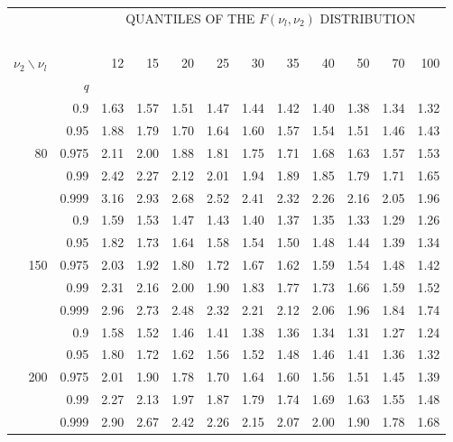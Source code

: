 \documentclass[12pt,a4paper,openany,twoside]{report}
\theoremstyle{definition}
\theoremstyle{remark}
\theoremstyle{plain}
\theoremstyle{definition}
\theoremstyle{definition}
\theoremstyle{definition}
\theoremstyle{remark}
\begin{document}
\begin{center}
\begin{tabular}{rr@{\ \ }r@{\ \ }r@{\ \ }r@{\ \ }r@{\ \ }r@{\ \ }r@{\ \ }r@{\ \ }r@{\ \ }r@{\ \ }r@{ }}
& &\multicolumn{10}{c}{QUANTILES OF THE $F(\nu_l, \nu_2)$ DISTRIBUTION}\\
\ \\
$\nu_2\backslash\nu_l$ & & 12 & 15 & 20 & 25 & 30 & 35 & 40 & 50 & 70 & 100\\
 & \textit{q}  &  &  &  &  &  &  &  &  & & \\
\rule{0pt}{2.5ex} & 0.9 & 1.63 & 1.57 & 1.51 & 1.47 & 1.44 & 1.42 & 1.40 & 1.38 & 1.34 & 1.32\\
 & 0.95 & 1.88 & 1.79 & 1.70 & 1.64 & 1.60 & 1.57 & 1.54 & 1.51 & 1.46 & 1.43\\
80 & 0.975 & 2.11 & 2.00 & 1.88 & 1.81 & 1.75 & 1.71 & 1.68 & 1.63 & 1.57 & 1.53\\
 & 0.99 & 2.42 & 2.27 & 2.12 & 2.01 & 1.94 & 1.89 & 1.85 & 1.79 & 1.71 & 1.65\\
 & 0.999 & 3.16 & 2.93 & 2.68 & 2.52 & 2.41 & 2.32 & 2.26 & 2.16 & 2.05 & 1.96\\
\rule{0pt}{2.5ex} & 0.9 & 1.59 & 1.53 & 1.47 & 1.43 & 1.40 & 1.37 & 1.35 & 1.33 & 1.29 & 1.26\\
 & 0.95 & 1.82 & 1.73 & 1.64 & 1.58 & 1.54 & 1.50 & 1.48 & 1.44 & 1.39 & 1.34\\
150 & 0.975 & 2.03 & 1.92 & 1.80 & 1.72 & 1.67 & 1.62 & 1.59 & 1.54 & 1.48 & 1.42\\
 & 0.99 & 2.31 & 2.16 & 2.00 & 1.90 & 1.83 & 1.77 & 1.73 & 1.66 & 1.59 & 1.52\\
 & 0.999 & 2.96 & 2.73 & 2.48 & 2.32 & 2.21 & 2.12 & 2.06 & 1.96 & 1.84 & 1.74\\
\rule{0pt}{2.5ex} & 0.9 & 1.58 & 1.52 & 1.46 & 1.41 & 1.38 & 1.36 & 1.34 & 1.31 & 1.27 & 1.24\\
 & 0.95 & 1.80 & 1.72 & 1.62 & 1.56 & 1.52 & 1.48 & 1.46 & 1.41 & 1.36 & 1.32\\
200 & 0.975 & 2.01 & 1.90 & 1.78 & 1.70 & 1.64 & 1.60 & 1.56 & 1.51 & 1.45 & 1.39\\
 & 0.99 & 2.27 & 2.13 & 1.97 & 1.87 & 1.79 & 1.74 & 1.69 & 1.63 & 1.55 & 1.48\\
 & 0.999 & 2.90 & 2.67 & 2.42 & 2.26 & 2.15 & 2.07 & 2.00 & 1.90 & 1.78 & 1.68\\ 
\end{tabular}
\end{center}
\end{document}
